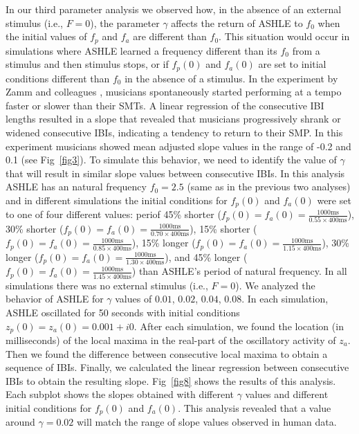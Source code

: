 \documentclass[10pt,letterpaper]{article}
\begin{document}
In our third parameter analysis we observed how, in the absence of an external stimulus (i.e., $F = 0$), the parameter $\gamma$ affects the return of ASHLE to $f_0$ when the initial values of $f_p$ and $f_a$ are different than $f_0$. This situation would occur in simulations where ASHLE learned a frequency different than its $f_0$ from a stimulus and then stimulus stops, or if $f_p(0)$ and $f_a(0)$ are set to initial conditions different than $f_0$ in the absence of a stimulus. In the experiment by Zamm and colleagues \cite{zamm2018musicians}, musicians spontaneously started performing at a tempo faster or slower than their SMTs. A linear regression of the consecutive IBI lengths resulted in a slope that revealed that musicians progressively shrank or widened consecutive IBIs, indicating a tendency to return to their SMP. In this experiment musicians showed mean adjusted slope values in the range of -0.2 and 0.1 (see Fig~\ref{fig3}). To simulate this behavior, we need to identify the value of $\gamma$ that will result in similar slope values between consecutive IBIs. In this analysis ASHLE has an natural frequency $f_0= 2.5$ (same as in the previous two analyses) and in different simulations the initial conditions for $f_p(0)$ and $f_a(0)$ were set to one of four different values: periof 45\% shorter ($f_p(0) = f_a(0) = \frac{1000\text{ms}}{0.55 \times 400\text{ms}}$), 30\% shorter ($f_p(0) = f_a(0) = \frac{1000\text{ms}}{0.70 \times 400\text{ms}}$), 15\% shorter ($f_p(0) = f_a(0) = \frac{1000\text{ms}}{0.85 \times 400\text{ms}}$), 15\% longer ($f_p(0) = f_a(0) = \frac{1000\text{ms}}{1.15 \times 400\text{ms}}$), 30\% longer ($f_p(0) = f_a(0) = \frac{1000\text{ms}}{1.30 \times 400\text{ms}}$), and 45\% longer ($f_p(0) = f_a(0) = \frac{1000\text{ms}}{1.45 \times 400\text{ms}}$) than ASHLE's period of natural frequency. In all simulations there was no external stimulus (i.e., $F = 0$). We analyzed the behavior of ASHLE for $\gamma$ values of $0.01$, $0.02$, $0.04$, $0.08$. In each simulation, ASHLE oscillated for 50 seconds with initial conditions $z_p(0)=z_a(0)=0.001 + i0$. After each simulation, we found the location (in milliseconds) of the local maxima in the real-part of the oscillatory activity of $z_a$. Then we found the difference between consecutive local maxima to obtain a sequence of IBIs. Finally, we calculated the linear regression between consecutive IBIs to obtain the resulting slope. Fig~\ref{fig8} shows the results of this analysis. Each subplot shows the slopes obtained with different $\gamma$ values and different initial conditions for $f_p(0)$ and $f_a(0)$. This analysis revealed that a value around $\gamma= 0.02$ will match the range of slope values observed in human data.
\end{document}
